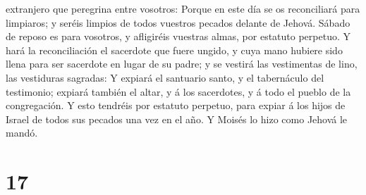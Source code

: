 extranjero que peregrina entre vosotros:  Porque en este
día se os reconciliará para limpiaros; y seréis limpios de todos
vuestros pecados delante de Jehová.  Sábado de reposo es
para vosotros, y afligiréis vuestras almas, por estatuto perpetuo.
 Y hará la reconciliación el sacerdote que fuere ungido, y
cuya mano hubiere sido llena para ser sacerdote en lugar de su padre; y
se vestirá las vestimentas de lino, las vestiduras sagradas:
 Y expiará el santuario santo, y el tabernáculo del
testimonio; expiará también el altar, y á los sacerdotes, y á todo el
pueblo de la congregación.  Y esto tendréis por estatuto
perpetuo, para expiar á los hijos de Israel de todos sus pecados una vez
en el año. Y Moisés lo hizo como Jehová le mandó.

\hypertarget{section-16}{%
\section{17}\label{section-16}}

